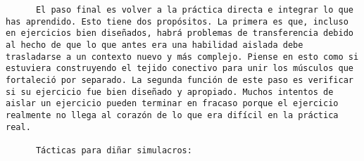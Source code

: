 \begin{verbatim}
	  El paso final es volver a la práctica directa e integrar lo que has aprendido. Esto tiene dos propósitos. La primera es que, incluso en ejercicios bien diseñados, habrá problemas de transferencia debido al hecho de que lo que antes era una habilidad aislada debe trasladarse a un contexto nuevo y más complejo. Piense en esto como si estuviera construyendo el tejido conectivo para unir los músculos que fortaleció por separado. La segunda función de este paso es verificar si su ejercicio fue bien diseñado y apropiado. Muchos intentos de aislar un ejercicio pueden terminar en fracaso porque el ejercicio realmente no llega al corazón de lo que era difícil en la práctica real. 
	  
	  Tácticas para diñar simulacros: 
	  
	  
	 
\end{verbatim}


